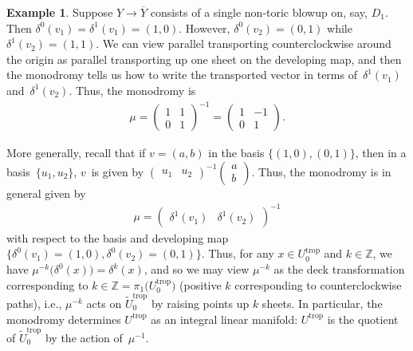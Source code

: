 \documentclass[10pt,a4paper]{amsart}
\numberwithin{equation}{section}
\numberwithin{figure}{section}
\numberwithin{table}{section}
\DeclareMathOperator{\trop}{trop}
\let\?=\overline
\let\bb=\mathbb
\let\rar=\rightarrow
\let\wt=\widetilde
\theoremstyle{definition}
\newtheorem{eg}[thm]{Example}
\begin{document}
\begin{eg} \label{focusfocus}Suppose $Y\rar \?{Y}$ consists of a single non-toric blowup on, say, $D_1$. Then $\delta^0(v_1)=\delta^1(v_1)=(1,0)$. However, $\delta^0(v_2) = (0,1)$ while $\delta^1(v_2) = (1,1)$. We can view parallel transporting counterclockwise around the origin as parallel transporting up one sheet on the developing map, and then the monodromy tells us how to write the transported vector in terms of~$\delta^1(v_1)$ and~$\delta^1(v_2)$. Thus, the monodromy is
\begin{gather*}
	\mu=\left(\begin{matrix}
		1 &1 \\
		0 &1
		\end{matrix}\right)^{-1}
	=	\left(\begin{matrix}
		1 &-1 \\
		0 &1
		\end{matrix}\right).	
\end{gather*}
\end{eg}

More generally, recall that if $v=(a,b)$ in the basis $\{(1,0), (0,1)\}$, then in a basis~$\{u_1,u_2\}$, $v$~is given by $\left(\begin{smallmatrix} u_1 & u_2 \end{smallmatrix} \right)^{-1}\left(\begin{smallmatrix} a \\ b \end{smallmatrix} \right)$. Thus, the monodromy is in general given by
\begin{gather*}
 \mu=\left(\begin{matrix}\delta^1(v_{1}) & \delta^1(v_{2}) \end{matrix} \right)^{-1}
\end{gather*} with respect to the basis and developing map $\big\{\delta^0(v_{1})=(1,0),\delta^0(v_{2})=(0,1)\big\}$. Thus, for any \mbox{$x\in U^{\trop}_0$} and $k\in \bb{Z}$, we have $\mu^{-k}\big(\delta^0(x)\big)=\delta^k(x)$, and so we may view $\mu^{-k}$ as the deck transformation corresponding to $k\in \bb{Z}=\pi_1\big(U^{\trop}_0\big)$ (positive $k$ corresponding to counterclockwise paths), i.e., $\mu^{-k}$ acts on $\wt{U}_0^{\trop}$ by raising points up $k$ sheets. In particular, the monodromy determines $U^{\trop}$ as an integral linear manifold: $U^{\trop}$ is the quotient of $\wt{U}_0^{\trop}$ by the action of~$\mu^{-1}$.
\end{document}
